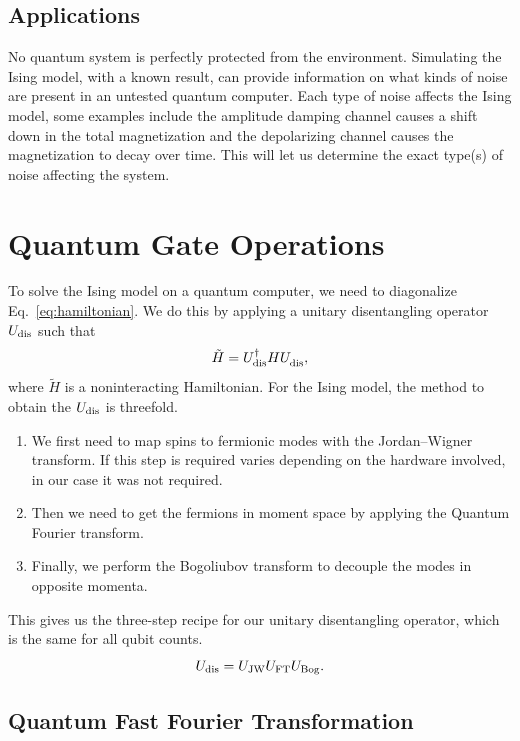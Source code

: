 \documentclass[12pt]{article}
\begin{document}
  \subsection{Applications}

No quantum system is perfectly protected from the environment. Simulating the Ising model, with a known result, can provide information on what kinds of noise are present in an untested quantum computer. Each type of noise affects the Ising model, some examples include the amplitude damping channel causes a shift down in the total magnetization and the depolarizing channel causes the magnetization to decay over time. This will let us determine the exact type(s) of noise affecting the system.

  \section{Quantum Gate Operations}
 To solve the Ising model on a quantum computer, we need to diagonalize Eq.~\eqref{eq:hamiltonian}. We do this by applying a unitary disentangling operator \( U_{\textnormal{dis}} \) such that
  \begin{equation}
    \tilde{H}
      = U_{\textnormal{dis}}^{\dagger} H
        U_{\textnormal{dis}}^{\vphantom{\dagger}},
  \end{equation}
  where \( \tilde{H} \) is a noninteracting Hamiltonian. For the Ising model, the method to obtain the \( U_{\textnormal{dis}} \) is threefold.
  \begin{enumerate}
   \item We first need to map spins to fermionic modes with the Jordan--Wigner transform. If this step is required varies depending on the hardware involved, in our case it was not required.
   \item Then we need to get the fermions in moment space by applying the Quantum Fourier transform.
   \item Finally, we perform the Bogoliubov transform to decouple the modes in opposite momenta.
  \end{enumerate}
  This gives us the three-step recipe for our unitary disentangling operator, which is the same for all qubit counts.
  \begin{equation}
    U_{\textnormal{dis}}
      = U_{\textnormal{JW}} U_{\textnormal{FT}} U_{\textnormal{Bog}}.
  \end{equation}

  \subsection{Quantum Fast Fourier Transformation}
\end{document}
